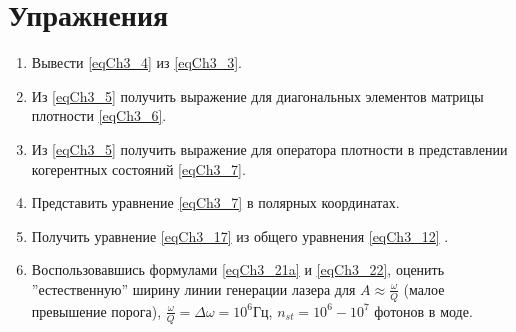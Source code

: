 \section{Упражнения}
\begin{enumerate}
\item Вывести \eqref{eqCh3_4} из \eqref{eqCh3_3}.
\item Из \eqref{eqCh3_5} получить выражение для диагональных элементов
  матрицы плотности \eqref{eqCh3_6}.
\item Из \eqref{eqCh3_5} получить выражение для оператора плотности в
  представлении когерентных состояний \eqref{eqCh3_7}.
\item Представить уравнение \eqref{eqCh3_7} в полярных координатах.
\item Получить уравнение \eqref{eqCh3_17} из общего уравнения
  \eqref{eqCh3_12} .
\item Воспользовавшись \label{qLaserBandwidth} формулами
  \eqref{eqCh3_21a} и \eqref{eqCh3_22}, 
  оценить ''естественную'' ширину линии генерации лазера для $A
  \approx \frac{\omega}{Q}$ (малое превышение порога), 
$\frac{\omega}{Q} = \Delta \omega = 10^6 \mbox{Гц}$, 
$n_{st} = 10^6 - 10^7$ фотонов в моде. 
\end{enumerate}
